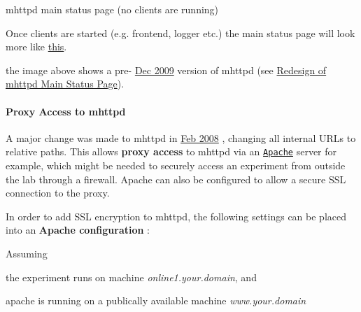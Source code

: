 \label{RC_mhttpd_utility_RC_mhttpd_minimal_status_page}
\hypertarget{RC_mhttpd_utility_RC_mhttpd_minimal_status_page}{}
 \begin{center} mhttpd main status page (no clients are running) \par
\par
\par
   \end{center}  \par


Once clients are started (e.g. frontend, logger etc.) the main status page will look more like \hyperlink{RC_mhttpd_Main_Status_page_RC_mhttpd_msp_customized}{this}.

the image above shows a pre-\/ \hyperlink{NDF_ndf_dec_2009}{Dec 2009} version of mhttpd (see \hyperlink{RC_mhttpd_status_page_redesign}{Redesign of mhttpd Main Status Page}).

\par
 

 \par


\label{RC_mhttpd_utility_idx_mhttpd_proxy-access}
\hypertarget{RC_mhttpd_utility_idx_mhttpd_proxy-access}{}
 \label{RC_mhttpd_utility_idx_access-control_mhttpd-proxy}
\hypertarget{RC_mhttpd_utility_idx_access-control_mhttpd-proxy}{}
 \label{RC_mhttpd_utility_idx_Apache}
\hypertarget{RC_mhttpd_utility_idx_Apache}{}
 \hypertarget{RC_mhttpd_utility_RC_mhttpd_proxy}{}\paragraph{Proxy Access to mhttpd}\label{RC_mhttpd_utility_RC_mhttpd_proxy}
A major change was made to mhttpd in \hyperlink{NDF_ndf_feb_2008}{Feb 2008} , changing all internal URLs to relative paths. This allows {\bfseries proxy access} to mhttpd via an \href{http://apache.org/}{\tt Apache} server for example, which might be needed to securely access an experiment from outside the lab through a firewall. Apache can also be configured to allow a secure SSL connection to the proxy.

In order to add SSL encryption to mhttpd, the following settings can be placed into an {\bfseries Apache configuration} : \par
 Assuming
\begin{DoxyItemize}
\item the experiment runs on machine {\itshape online1.your.domain\/}, and
\item apache is running on a publically available machine {\itshape www.your.domain\/} \par

\end{DoxyItemize}


